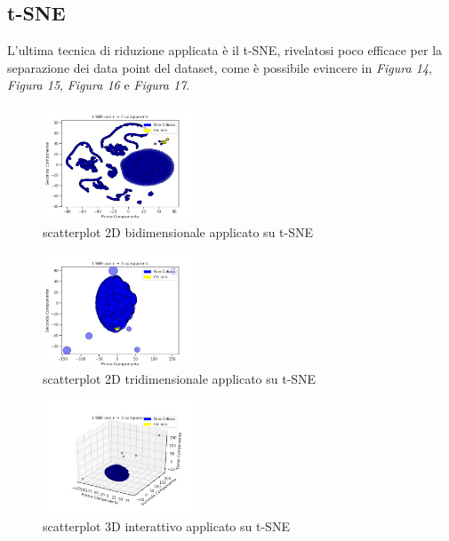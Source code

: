 \documentclass[11pt,a4paper,twocolumn]{article}
\begin{document}
    \subsection{t-SNE}
    
    L'ultima tecnica di riduzione applicata è il t-SNE, rivelatosi poco efficace per la separazione dei data point del dataset, come è possibile evincere in \emph{Figura 14}, \emph{Figura 15}, \emph{Figura 16} e \emph{Figura 17}.

	\begin{figure}[H]
		\centering
		\includegraphics[width=0.4\textwidth]{img/tSNE_2Dnc2.png}
		\caption{scatterplot 2D bidimensionale applicato su t-SNE}
	\end{figure}

	\begin{figure}[H]
		\centering
		\includegraphics[width=0.4\textwidth]{img/tSNE_2Dnc3.png}
		\caption{scatterplot 2D tridimensionale applicato su t-SNE}
	\end{figure}

	\begin{figure}[H]
		\centering
		\includegraphics[width=0.4\textwidth]{img/tSNE_i3D.png}
		\caption{scatterplot 3D interattivo applicato su t-SNE}
	\end{figure}
\end{document}
